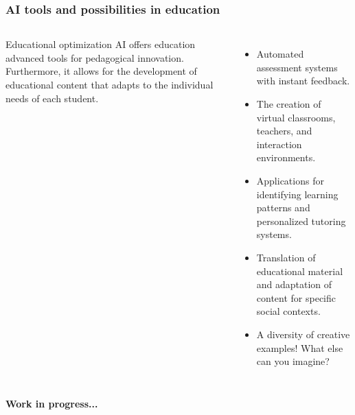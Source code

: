 \documentclass{beamer}
\begin{document}




\begin{frame}
    \frametitle{AI tools and possibilities in education}
\vspace{-0.5cm}
      \begin{columns}[t]
  
    \begin{myblock}{Educational optimization}
        AI offers edu\-cation advanced tools for pedagogical inno\-vation. Furthermore, it allows for the development of educational content that adapts to the individual needs of each student.
    \end{myblock}

  
    \begin{itemize}
    \item Automated assessment systems with instant feedback.
      \item The creation of virtual classrooms, teachers, and interaction environments. 
        \item Applications for identifying learning patterns and personalized tutoring systems.
        \item Translation of educational material and adaptation of content for specific social contexts.
        \item A diversity of creative examples! What else can you imagine? 
    \end{itemize}
      \end{columns}
      \pause
      \textbf{Work in progress...}
\end{frame}
\end{document}
